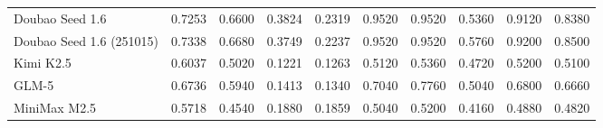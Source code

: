 \begin{table}[ht]
\begin{tabular}{l|cc|cc|ccccc}
Doubao Seed 1.6 & 0.7253 & 0.6600 & 0.3824 & 0.2319 & 0.9520 & 0.9520 & 0.5360 & 0.9120 & 0.8380 \\
Doubao Seed 1.6 (251015) & 0.7338 & 0.6680 & 0.3749 & 0.2237 & 0.9520 & 0.9520 & 0.5760 & 0.9200 & 0.8500 \\
Kimi K2.5 & 0.6037 & 0.5020 & 0.1221 & 0.1263 & 0.5120 & 0.5360 & 0.4720 & 0.5200 & 0.5100 \\
GLM-5 & 0.6736 & 0.5940 & 0.1413 & 0.1340 & 0.7040 & 0.7760 & 0.5040 & 0.6800 & 0.6660 \\
MiniMax M2.5 & 0.5718 & 0.4540 & 0.1880 & 0.1859 & 0.5040 & 0.5200 & 0.4160 & 0.4880 & 0.4820 \\
\bottomrule
\end{tabular}
\end{table}